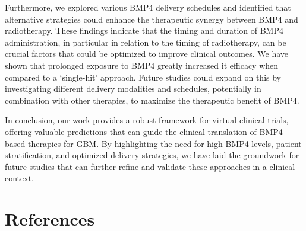 \documentclass[
  letterpaper,
]{scrreprt}
\theoremstyle{definition}
\theoremstyle{remark}
\begin{document}
Furthermore, we explored various BMP4 delivery schedules and identified
that alternative strategies could enhance the therapeutic synergy
between BMP4 and radiotherapy. These findings indicate that the timing
and duration of BMP4 administration, in particular in relation to the
timing of radiotherapy, can be crucial factors that could be optimized
to improve clinical outcomes. We have shown that prolonged exposure to
BMP4 greatly increased it efficacy when compared to a `single-hit'
approach. Future studies could expand on this by investigating different
delivery modalities and schedules, potentially in combination with other
therapies, to maximize the therapeutic benefit of BMP4.

In conclusion, our work provides a robust framework for virtual clinical
trials, offering valuable predictions that can guide the clinical
translation of BMP4-based therapies for GBM. By highlighting the need
for high BMP4 levels, patient stratification, and optimized delivery
strategies, we have laid the groundwork for future studies that can
further refine and validate these approaches in a clinical context.


\chapter*{References}\label{references}

\end{document}
